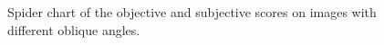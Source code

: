 \begin{figure}[h]
    \caption{Spider chart of the objective and subjective scores on images with different oblique angles.}
    \label{fig:spiderTilted}
\end{figure}


